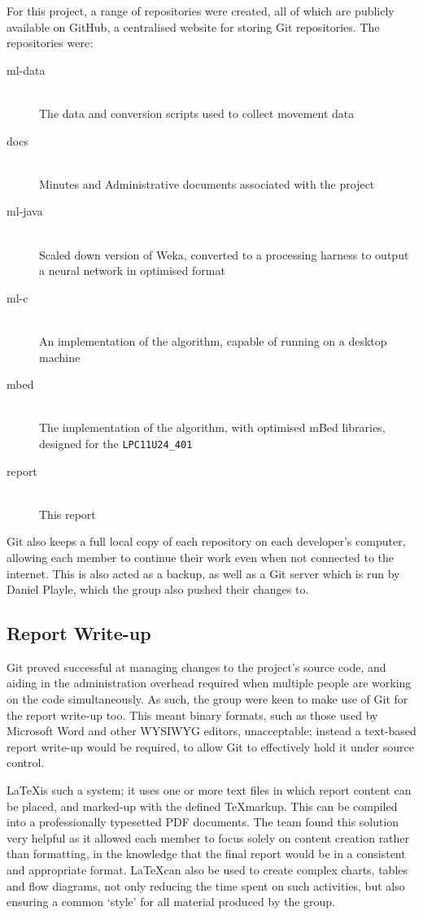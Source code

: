 For this project, a range of repositories were created, all of which are publicly available on GitHub, a centralised website for storing Git repositories. The repositories were:

\begin{description}
    \item[ml-data] \hfill \\ The data and conversion scripts used to collect movement data
    \item[docs] \hfill \\ Minutes and Administrative documents associated with the project
    \item[ml-java] \hfill \\ Scaled down version of Weka, converted to a processing harness to output a neural network in optimised format
    \item[ml-c] \hfill \\ An implementation of the algorithm, capable of running on a desktop machine
    \item[mbed] \hfill \\ The implementation of the algorithm, with optimised mBed libraries, designed for the \verb|LPC11U24_401|
    \item[report] \hfill \\ This report
\end{description}

Git also keeps a full local copy of each repository on each developer's computer, allowing each member to continue their work even when not connected to the internet. This is also acted as a backup, as well as a Git server which is run by Daniel Playle, which the group also pushed their changes to.

\subsection{Report Write-up}
Git proved successful at managing changes to the project's source code, and aiding in the administration overhead required when multiple people are working on the code simultaneously. As such, the group were keen to make use of Git for the report write-up too. This meant binary formats, such as those used by Microsoft Word and other WYSIWYG editors, unacceptable; instead a text-based report write-up would be required, to allow Git to effectively hold it under source control.

\LaTeX is such a system; it uses one or more text files in which report content can be placed, and marked-up with the defined \TeX markup. This can be compiled into a professionally typesetted PDF documents. The team found this solution very helpful as it allowed each member to focus solely on content creation rather than formatting, in the knowledge that the final report would be in a consistent and appropriate format. \LaTeX can also be used to create complex charts, tables and flow diagrams, not only reducing the time spent on such activities, but also ensuring a common `style' for all material produced by the group.

